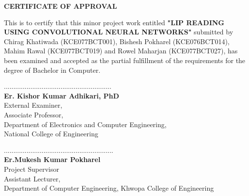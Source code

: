 \newlength{\whitespaceLength}
\setlength{\whitespaceLength}{1in} %

\vspace*{\whitespaceLength}

\begin{center}
\large{\textbf{CERTIFICATE OF APPROVAL}}
\end{center}

\begingroup
\RaggedRight
            \vspace{0.5cm}
            This is to certify that this minor project work entitled \textbf{"LIP READING USING CONVOLUTIONAL NEURAL NETWORKS"} submitted by Chirag Khatiwada (KCE077BCT001), Bishesh Pokharel (KCE076BCT014), Mahim Rawal (KCE077BCT019) and Rowel Maharjan (KCE077BCT027),  has been examined and accepted as the partial fulfillment of the requirements for the degree of Bachelor in Computer.\\
            \vspace{0.5in}
            \begin{multicols}{2}
            	\begin{center}
            	
                \setlength{\whitespaceLength}{0.5in}
                \null\vspace{\whitespaceLength}
            		 
          .........................................................\\
            \textbf{Er. Kishor Kumar Adhikari, PhD}\\
            External Examiner,\\
            Associate Professor,\\ 
            Department of Electronics and Computer Engineering,\\
            National College of Engineering
            		
            	\end{center}
            
            \columnbreak
            	\begin{center}
                \setlength{\whitespaceLength}{0.5in}
                \null\vspace{\whitespaceLength}
         ..........................................................\\
        \textbf{Er.Mukesh Kumar Pokharel}\\
    Project Supervisor \\
    Assistant Lecturer,\\
    Department of Computer Engineering,
    Khwopa College of Engineering
        \end{center}
            \end{multicols}
